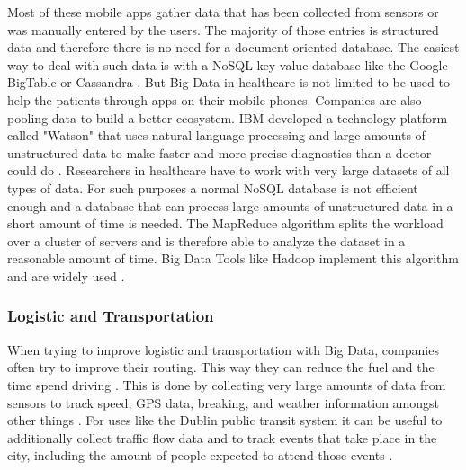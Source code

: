 \documentclass[runningheads]{llncs}
\begin{document}
Most of these mobile apps gather data that has been collected from sensors or was manually entered by the users. The majority of those entries is structured data and therefore there is no need for a document-oriented database. The easiest way to deal with such data is with a NoSQL key-value database like the Google BigTable or Cassandra \cite{GLOSSARY}.
But Big Data in healthcare is not limited to be used to help the patients through apps on their mobile phones. Companies are also pooling data to build a better ecosystem. IBM developed a technology platform called "Watson" that uses natural language processing and large amounts of unstructured data to make faster and more precise diagnostics than a doctor could do \cite{WATSON}.
Researchers in healthcare have to work with very large datasets of all types of data. 
For such purposes a normal NoSQL database is not efficient enough and a database that can process large amounts of unstructured data in a short amount of time is needed. The MapReduce algorithm  splits the workload over a cluster of servers and is therefore able to analyze the dataset in a reasonable amount of time. Big Data Tools like Hadoop implement this algorithm and are widely used \cite{GLOSSARY}.


\subsubsection{Logistic and Transportation} 
When trying to improve logistic and transportation with Big Data, companies often try to improve their routing. This way they can reduce the fuel and the time spend driving \cite{DAVENPORT}. This is done by collecting very large amounts of data from sensors to track speed, GPS data, breaking, and weather information amongst other things \cite{DAVENPORT}. For uses like the Dublin public transit system it can be useful to additionally collect traffic flow data and to track events that take place in the city, including the amount of people expected to attend those events \cite{TRANSPORT}.
\end{document}
